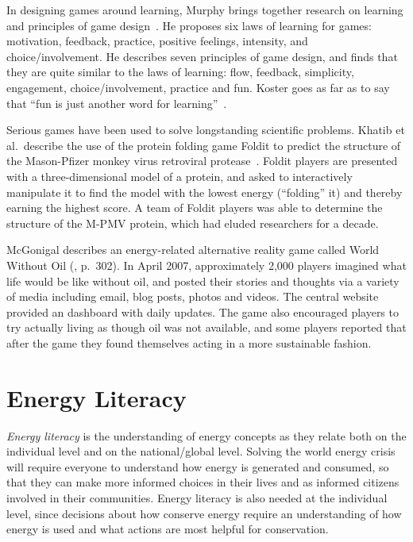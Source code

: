 In designing games around learning, Murphy brings together research on learning and principles of game design~\cite{Murphy2011}. He proposes six laws of learning for games: motivation, feedback, practice, positive feelings, intensity, and choice/involvement. He describes seven principles of game design, and finds that they are quite similar to the laws of learning: flow, feedback, simplicity, engagement, choice/involvement, practice and fun. Koster goes as far as to say that ``fun is just another word for learning''~\cite{Koster-theory-of-fun}.

Serious games have been used to solve longstanding scientific problems. Khatib et al.\ describe the use of the protein folding game Foldit to predict the structure of the Mason-Pfizer monkey virus retroviral protease~\cite{Khatib2011}. Foldit players are presented with a three-dimensional model of a protein, and asked to interactively manipulate it to find the model with the lowest energy (``folding'' it) and thereby earning the highest score. A team of Foldit players was able to determine the structure of the M-PMV protein, which had eluded researchers for a decade.

McGonigal describes an energy-related alternative reality game called World Without Oil (\cite{mcgonigal2011reality}, p.\ 302). In April 2007, approximately 2,000 players imagined what life would be like without oil, and posted their stories and thoughts via a variety of media including email, blog posts, photos and videos. The central website~\cite{worldwithoutoil} provided an dashboard with daily updates. The game also encouraged players to try actually living as though oil was not available, and some players reported that after the game they found themselves acting in a more sustainable fashion.


\section{Energy Literacy}
\label{sec:energy-literacy}

\emph{Energy literacy} is the understanding of energy concepts as they relate both on the individual level and on the national/global level. Solving the world energy crisis will require everyone to understand how energy is generated and consumed, so that they can make more informed choices in their lives and as informed citizens involved in their communities. Energy literacy is also needed at the individual level, since decisions about how conserve energy require an understanding of how energy is used and what actions are most helpful for conservation.

